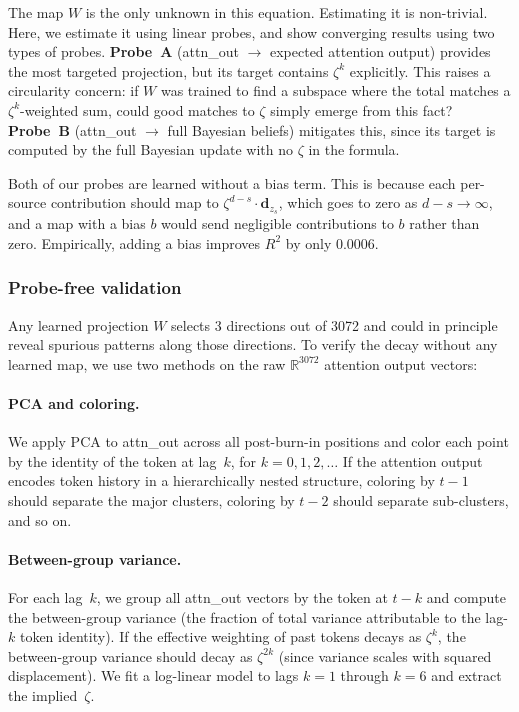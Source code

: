 \documentclass[midterm]{sparreport}
\begin{document}
The map $W$ is the only unknown in this equation. Estimating it is non-trivial. Here, we estimate it using linear probes, and show converging results using two types of probes. \textbf{Probe~A} (attn\_out $\to$ expected attention output) provides the most targeted projection, but its target contains $\zeta^k$ explicitly. This raises a circularity concern: if $W$ was trained to find a subspace where the total matches a $\zeta^k$-weighted sum, could good matches to $\zeta$ simply emerge from this fact? \textbf{Probe~B} (attn\_out $\to$ full Bayesian beliefs) mitigates this, since its target is computed by the full Bayesian update with no $\zeta$ in the formula.

Both of our probes are learned without a bias term. This is because each per-source contribution should map to $\zeta^{d-s} \cdot \mathbf{d}_{z_s}$, which goes to zero as $d - s \to \infty$, and a map with a bias $b$ would send negligible contributions to $b$ rather than zero. Empirically, adding a bias improves $R^2$ by only 0.0006.
 
\subsubsection{Probe-free validation}
\label{sec:probefree}
Any learned projection $W$ selects 3 directions out of 3072 and could in principle reveal spurious patterns along those directions. To verify the decay without any learned map, we use two methods on the raw $\mathbb{R}^{3072}$ attention output vectors:
 
\paragraph{PCA and coloring.} We apply PCA to attn\_out across all post-burn-in positions and color each point by the identity of the token at lag~$k$, for $k = 0, 1, 2, \ldots$ If the attention output encodes token history in a hierarchically nested structure, coloring by $t{-}1$ should separate the major clusters, coloring by $t{-}2$ should separate sub-clusters, and so on.
 
\paragraph{Between-group variance.} For each lag~$k$, we group all attn\_out vectors by the token at $t{-}k$ and compute the between-group variance (the fraction of total variance attributable to the lag-$k$ token identity). If the effective weighting of past tokens decays as $\zeta^k$, the between-group variance should decay as $\zeta^{2k}$ (since variance scales with squared displacement). We fit a log-linear model to lags $k = 1$ through $k = 6$ and extract the implied~$\zeta$.
\end{document}
